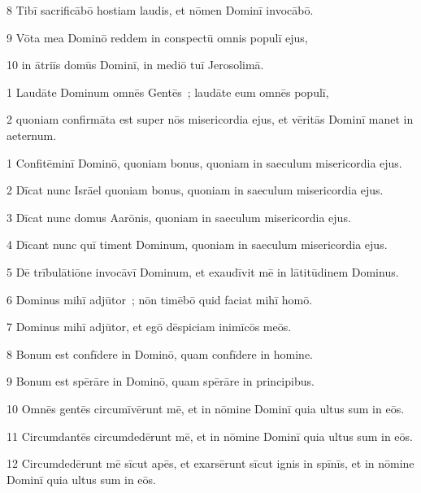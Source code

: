 \psalmVerse
  {\phantom{00}8}
  {Tibī sacrificābō hostiam laudis, et nōmen Dominī invocābō.}


\psalmVerse
  {\phantom{00}9}
  {Vōta mea Dominō reddem in conspectū omnis populī ejus,}


\psalmVerse
  {\phantom{0}10}
  {in ātriīs domūs Dominī, in mediō tuī Jerosolimā.}



\psalmVerse
  {\phantom{00}1}
  {Laudāte Dominum omnēs Gentēs~; laudāte eum omnēs populī,}


\psalmVerse
  {\phantom{00}2}
  {quoniam confirmāta est super nōs misericordia ejus, et vēritās Dominī manet in aeternum.}



\psalmVerse
  {\phantom{00}1}
  {Confitēminī Dominō, quoniam bonus, quoniam in saeculum misericordia ejus.}


\psalmVerse
  {\phantom{00}2}
  {Dīcat nunc Isrāel quoniam bonus, quoniam in saeculum misericordia ejus.}


\psalmVerse
  {\phantom{00}3}
  {Dīcat nunc domus Aarōnis, quoniam in saeculum misericordia ejus.}


\psalmVerse
  {\phantom{00}4}
  {Dīcant nunc quī timent Dominum, quoniam in saeculum misericordia ejus.}


\psalmVerse
  {\phantom{00}5}
  {Dē trībulātiōne invocāvī Dominum, et exaudīvit mē in lātitūdinem Dominus.}


\psalmVerse
  {\phantom{00}6}
  {Dominus mihī adjūtor~; nōn timēbō quid faciat mihī homō.}


\psalmVerse
  {\phantom{00}7}
  {Dominus mihī adjūtor, et egō dēspiciam inimīcōs meōs.}


\psalmVerse
  {\phantom{00}8}
  {Bonum est confīdere in Dominō, quam confīdere in homine.}


\psalmVerse
  {\phantom{00}9}
  {Bonum est spērāre in Dominō, quam spērāre in principibus.}


\psalmVerse
  {\phantom{0}10}
  {Omnēs gentēs circumīvērunt mē, et in nōmine Dominī quia ultus sum in eōs.}


\psalmVerse
  {\phantom{0}11}
  {Circumdantēs circumdedērunt mē, et in nōmine Dominī quia ultus sum in eōs.}


\psalmVerse
  {\phantom{0}12}
  {Circumdedērunt mē sīcut apēs, et exarsērunt sīcut ignis in spīnīs, et in nōmine Dominī quia ultus sum in eōs.}


